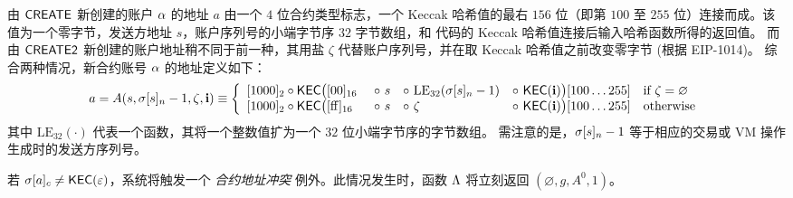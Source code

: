 由 {\hyperlink{create}{$\mathsf{CREATE}$}} 新创建的账户 $\mathbf{\alpha}$ 的地址 $a$ 由一个 $4$ 位合约类型标志，一个 Keccak 哈希值的最右 $156$ 位（即第 $100$ 至 $255$ 位）连接而成。该值为一个零字节，发送方地址 $s$，账户序列号的小端字节序 $32$ 字节数组，和 \cvm 代码的 Keccak 哈希值连接后输入哈希函数所得的返回值。
% 
而由 {\hyperlink{create2}{$\mathsf{CREATE2}$}} 新创建的账户地址稍不同于前一种，其用盐 $\zeta$ 代替账户序列号，并在取 Keccak 哈希值之前改变零字节 (根据 EIP-1014)。
综合两种情况，新合约账号 $\mathbf{\alpha}$ 的地址定义如下：
\begin{align}\label{eq:new-address}
	a= A(s, \st[s]_{n} - 1, \zeta, \vec{i}) \eqdef 
	\left\{\begin{array}{l l l l l}
	 	\typecontract \circ \kec\big([\mathrm{00}]_{16} &~\circ~ s &\circ~ \mathrm{LE}_{32}(\st[s]_n-1) &\circ~ \kec(\vec{i}) \big)[100 \dots 255]
	 	& \text{if}\ \zeta = \varnothing \\
	 	\typecontract \circ \kec\big([\mathrm{ff}]_{16} &~\circ~ s &\circ~  \zeta   &\circ~ \kec(\vec{i}) \big)[100 \dots 255] 
		& \text{otherwise}
	\end{array} \right.
\end{align}
其中 $\mathrm{LE}_{32}(\cdot)$ 代表一个函数，其将一个整数值扩为一个 $32$ 位小端字节序的字节数组。
%
需注意的是，$\mathbf{\sigma}[s]_n-1$ 等于相应的交易或 VM 操作生成时的发送方序列号。

若 $\mathbf{\sigma}[a]_c\neq \mathsf{KEC}(\mathbb{\varepsilon})$，系统将触发一个 \emph{合约地址冲突} 例外。此情况发生时，函数 $\mathrm{\Lambda}$ 将立刻返回 $(\varnothing,g,A^0,1)$。

